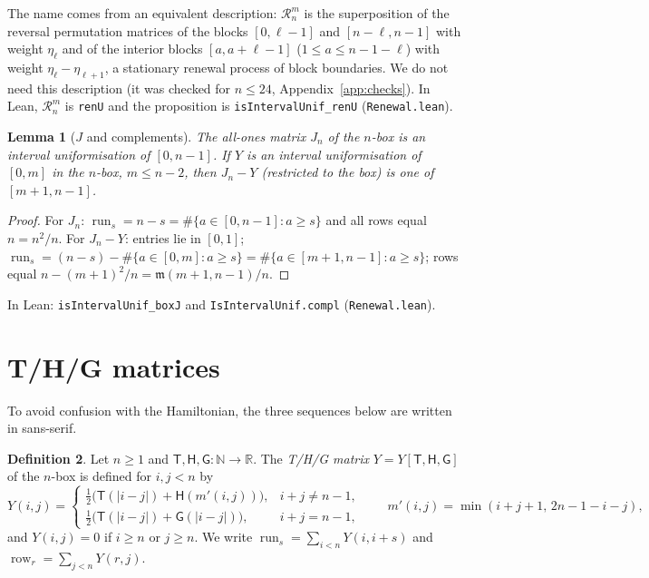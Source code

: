 \documentclass[11pt]{amsart}
\newtheorem{lemma}{Lemma}[section]
\theoremstyle{definition}
\newtheorem{definition}[lemma]{Definition}
\theoremstyle{remark}
\numberwithin{equation}{section}
\newcommand{\R}{\mathbb{R}}
\newcommand{\N}{\mathbb{N}}
\newcommand{\row}{\operatorname{row}}
\newcommand{\run}{\operatorname{run}}
\newcommand{\sT}{\mathsf{T}}
\newcommand{\sH}{\mathsf{H}}
\newcommand{\sG}{\mathsf{G}}
\newcommand{\cR}{\mathcal{R}}
\newcommand{\ms}{\mathfrak{m}}
\newcommand{\lean}[1]{\texttt{#1}}
\begin{document}
The name comes from an equivalent description: $\cR^m_n$ is the superposition of the reversal
permutation matrices of the blocks $[0,\ell-1]$ and $[n-\ell,n-1]$ with weight $\eta_\ell$ and of the
interior blocks $[a,a+\ell-1]$ ($1\le a\le n-1-\ell$) with weight $\eta_\ell-\eta_{\ell+1}$, a
stationary renewal process of block boundaries. We do not need this description (it was checked for
$n\le24$, Appendix~\ref{app:checks}). In Lean, $\cR^m_n$ is \lean{renU} and the proposition is
\lean{isIntervalUnif\_renU} (\lean{Renewal.lean}).

\begin{lemma}[$J$ and complements]\label{lem:compl}
The all-ones matrix $J_n$ of the $n$-box is an interval uniformisation of $[0,n-1]$. If $Y$ is an
interval uniformisation of $[0,m]$ in the $n$-box, $m\le n-2$, then $J_n-Y$ (restricted to the box) is
one of $[m+1,n-1]$.
\end{lemma}

\begin{proof}
For $J_n$: $\run_s=n-s=\#\{a\in[0,n-1]:a\ge s\}$ and all rows equal $n=n^2/n$. For $J_n-Y$: entries lie in
$[0,1]$; $\run_s=(n-s)-\#\{a\in[0,m]:a\ge s\}=\#\{a\in[m+1,n-1]:a\ge s\}$; rows equal
$n-(m+1)^2/n=\ms(m+1,n-1)/n$.
\end{proof}

In Lean: \lean{isIntervalUnif\_boxJ} and \lean{IsIntervalUnif.compl} (\lean{Renewal.lean}).

\section{T/H/G matrices}\label{sec:thg}

To avoid confusion with the Hamiltonian, the three sequences below are written in sans-serif.

\begin{definition}\label{def:thg}
Let $n\ge1$ and $\sT,\sH,\sG:\N\to\R$. The \emph{T/H/G matrix} $Y=Y[\sT,\sH,\sG]$ of the $n$-box is
defined for $i,j<n$ by
\[
  Y(i,j)=
  \begin{cases}
    \tfrac12\bigl(\sT(|i-j|)+\sH(m'(i,j))\bigr), & i+j\ne n-1,\\[2pt]
    \tfrac12\bigl(\sT(|i-j|)+\sG(|i-j|)\bigr), & i+j=n-1,
  \end{cases}
  \qquad m'(i,j)=\min(i+j+1,\,2n-1-i-j),
\]
and $Y(i,j)=0$ if $i\ge n$ or $j\ge n$. We write $\run_s=\sum_{i<n}Y(i,i+s)$ and
$\row_r=\sum_{j<n}Y(r,j)$.
\end{definition}
\end{document}
